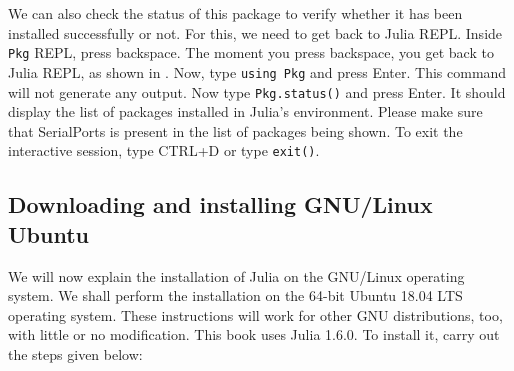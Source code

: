 We can also check the status of this package to verify whether it has been installed 
successfully or not. For this, we need to get back to Julia REPL. Inside {\tt Pkg}
REPL, press backspace. The moment you press backspace, you get back to Julia REPL, as shown in 
. Now, type {\tt using Pkg} and press Enter. This command will not 
generate any output. Now type {\tt Pkg.status()} and press Enter. It should display the 
list of packages installed in Julia's environment. Please make sure that SerialPorts 
is present in the list of packages being shown. To exit the interactive session, type CTRL+D or type {\tt exit()}. 

\subsection{Downloading and installing GNU/Linux Ubuntu} \label{julia-install-linux}
We will now explain the installation of Julia on the GNU/Linux operating system. 
We shall perform the installation on the 64-bit Ubuntu 18.04 LTS operating system.  
These instructions will work for other GNU distributions, too, with little or 
no modification. This book uses Julia 1.6.0. To install it, carry out the steps
given below: 

